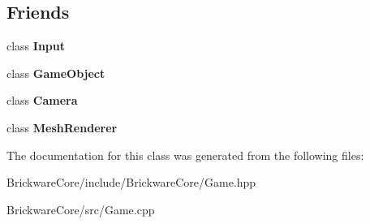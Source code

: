 \subsection*{Friends}
\begin{DoxyCompactItemize}
\item 
\hypertarget{classBrickware_1_1Core_1_1Game_a9732a2f3b51c8d069f54b1a13fb64c68}{}class {\bfseries Input}\label{classBrickware_1_1Core_1_1Game_a9732a2f3b51c8d069f54b1a13fb64c68}

\item 
\hypertarget{classBrickware_1_1Core_1_1Game_a00df87c957d8f7ee0fc51f07a0542f4a}{}class {\bfseries Game\+Object}\label{classBrickware_1_1Core_1_1Game_a00df87c957d8f7ee0fc51f07a0542f4a}

\item 
\hypertarget{classBrickware_1_1Core_1_1Game_ad8bd9afbbd7af19d996da80e9d25890d}{}class {\bfseries Camera}\label{classBrickware_1_1Core_1_1Game_ad8bd9afbbd7af19d996da80e9d25890d}

\item 
\hypertarget{classBrickware_1_1Core_1_1Game_aeba626af0b56820b14192cd581ebbf77}{}class {\bfseries Mesh\+Renderer}\label{classBrickware_1_1Core_1_1Game_aeba626af0b56820b14192cd581ebbf77}

\end{DoxyCompactItemize}


The documentation for this class was generated from the following files\+:\begin{DoxyCompactItemize}
\item 
Brickware\+Core/include/\+Brickware\+Core/Game.\+hpp\item 
Brickware\+Core/src/Game.\+cpp\end{DoxyCompactItemize}
